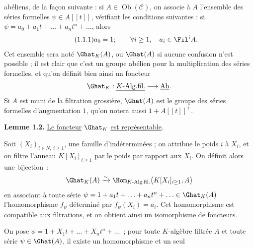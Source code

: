 
abéliens, de la
façon suivante : si \(A\in\operatorname{Ob}(\mathcal C)\), on associe à \(A\) l'ensemble des séries formelles \(\psi\in A[[t]]\), vérifiant les conditions suivantes : si \(\psi=a_0+a_1t+\ldots+a_nt^n+\ldots\), alors
\begin{equation}\tag{1.1.1}
  a_0=1;\qquad \forall i\geq 1,\quad a_i\in\Fil^i A .
\end{equation}
Cet ensemble sera noté \(\Ghat_K(A)\), ou \(\Ghat(A)\) si aucune confusion n'est possible ; il est clair que c'est un groupe abélien pour la multiplication des séries formelles, et qu'on définit bien ainsi un foncteur
\[
  \Ghat_K:\underline{K\text{-Alg.fil.}}\longrightarrow \underline{\mathrm{Ab}}.
\]
Si \(A\) est muni de la filtration grossière, \(\Ghat(A)\) est le groupe des séries formelles d'augmentation \(1\), qu'on notera aussi \(1+A[[t]]^+\).

\textbf{Lemme 1.2.} \uline{Le foncteur} \(\Ghat_K\) \uline{est représentable}.

Soit \((X_i)_{i\in N,\ i\geq 1}\), une famille d'indéterminées ; on attribue le poids \(i\) à \(X_i\), et on filtre l'anneau \(K[X_i]_{i\geq 1}\) par le poids par rapport aux \(X_i\). On définit alors une bijection~:
\[
  \Ghat_K(A)\xrightarrow{\sim}
  \Hom_{K\text{-Alg.fil.}}\bigl(K[X_i]_{i\geq 1},A\bigr)
\]
en associant à toute série \(\psi=1+a_1t+\ldots+a_nt^n+\ldots\in\Ghat_K(A)\) l'homomorphisme \(f_\psi\) déterminé par \(f_\psi(X_i)=a_i\). Cet homomorphisme est compatible aux filtrations, et on obtient ainsi un isomorphisme de foncteurs.

On pose \(\phi=1+X_1t+\ldots+X_nt^n+\ldots\)~; pour toute \(K\)-algèbre filtrée \(A\) et toute série \(\psi\in\Ghat(A)\), il existe un homomorphisme et un
seul 
